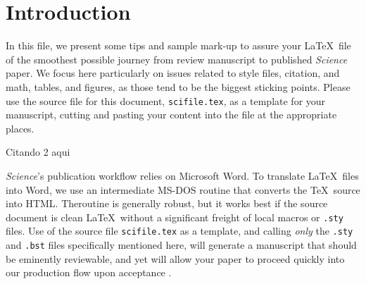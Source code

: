 
\section*{Introduction}

In this file, we present some tips and sample mark-up to assure your
\LaTeX\ file of the smoothest possible journey from review manuscript
to published {\it Science\/} paper.  We focus here particularly on
issues related to style files, citation, and math, tables, and
figures, as those tend to be the biggest sticking points.  Please use
the source file for this document, \texttt{scifile.tex}, as a template
for your manuscript, cutting and pasting your content into the file at
the appropriate places.


Citando 2 aqui \citet{Shipley2009}


{\it Science\/}'s publication workflow relies on Microsoft Word.  To translate %
\LaTeX\ files into Word, we use an intermediate MS-DOS routine that converts %
the \TeX\ source into HTML\@.  Theroutine is generally robust, but it works best if the source document is clean \LaTeX\ without a significant freight of local macros or \texttt{.sty} files.  Use of the source file \texttt{scifile.tex} as a template, and calling {\it only\/} the \texttt{.sty} and \texttt{.bst} files specifically mentioned here, will generate a manuscript that should be eminently reviewable, and yet will allow your paper to proceed quickly into our production flow upon acceptance .
